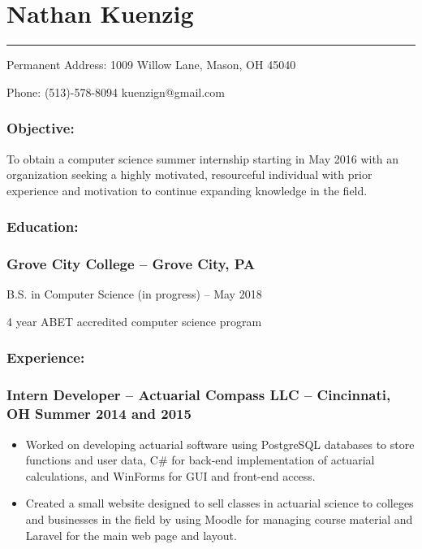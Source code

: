 \documentclass[12pt]{article}
\theoremstyle{plain} %
\theoremstyle{definition} %
\begin{document}
{
	\centering\section*{\color{head}Nathan Kuenzig}
	\vspace{-7mm}
	\noindent\color{head2}\rule{\textwidth}{1pt}
	
	{\footnotesize {\color{accent}Permanent Address:} 1009 Willow Lane, Mason, OH 45040
	
	{\color{accent}Phone:} (513)-578-8094  kuenzign@gmail.com}

}


\subsubsection*{\color{head}Objective:}
\small To obtain a computer science summer internship starting in May 2016 with an organization seeking a highly motivated, resourceful individual with prior experience and motivation to continue expanding knowledge in the field.

\subsubsection*{\color{head}Education:}
\subsubsection*{\textnormal{{\color{accent} Grove City College }\color{head} -- Grove City, PA}}

\noindent\hspace{2.25pc} B.S. in Computer Science (in progress) -- May 2018

\noindent\hspace{2.25pc} 4 year ABET accredited computer science program

\subsubsection*{\color{head}Experience:}
\subsubsection*{\textnormal{{\color{accent} Intern Developer }\color{head} -- Actuarial Compass LLC -- Cincinnati, OH	\hfill Summer 2014 and 2015}}
\begin{itemize}
	\item Worked on developing actuarial software using PostgreSQL databases to store functions and user data, C\# for back-end implementation of actuarial calculations, and WinForms for GUI and front-end access.
	\item Created a small website designed to sell classes in actuarial science to colleges and businesses in the field by using Moodle for managing course material and Laravel for the main web page and layout.
\end{itemize}
\end{document}
